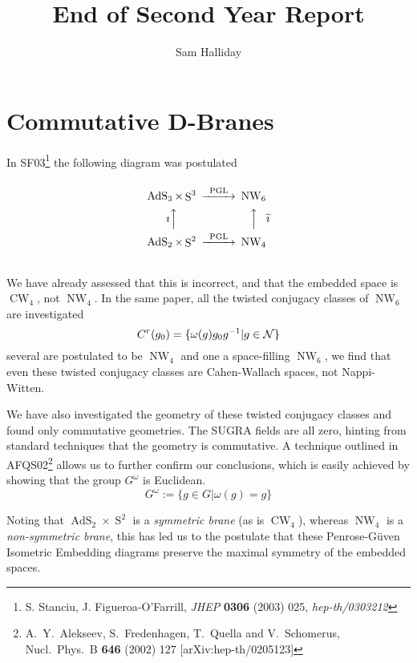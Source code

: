 \documentclass[a4,12pt,titlepage]{seminar}
\DeclareMathOperator{\AdS}{AdS}                         %
\DeclareMathOperator{\Sphere}{S}                        %
\let\S\Sphere                                           %
\DeclareMathOperator{\NW}{NW}                           %
\DeclareMathOperator{\CW}{CW}                           %
\begin{document}
\title{End of Second Year Report}
\author{Sam Halliday}
\maketitle

\section{Commutative D-Branes}

In SF03\footnote{S. Stanciu, J. Figueroa-O'Farrill, \textit{JHEP} \textbf{0306} (2003)
  025, \textit{hep-th/0303212}} the following diagram was postulated
\begin{equation*}
  \begin{CD}
    @.\\
    \AdS_3 \times \S^3             @>\text{PGL}>> \NW_6\\
    \text{$\imath$}@AAA @AAA\text{$\widetilde{\imath}$}\\
    \AdS_2 \times \S^2             @>\text{PGL}>> \NW_4\\
    @.
  \end{CD}
\end{equation*}
We have already assessed that this is incorrect, and that the embedded space is
$\CW_4$, not $\NW_4$. In the same paper, all the twisted conjugacy classes of
$\NW_6$ are investigated
\begin{equation*}
  C^r(g_0)=\{\omega(g)g_0g^{-1}|g\in {\cal N}\}
\end{equation*}
several are postulated to be $\NW_4$ and one a space-filling $\NW_6$, we find
that even these twisted conjugacy classes are Cahen-Wallach spaces, not
Nappi-Witten.

We have also investigated the geometry of these twisted conjugacy classes and
found only commutative geometries. The SUGRA fields are all zero, hinting from
standard techniques that the geometry is commutative. A technique outlined in
AFQS02\footnote{A.~Y.~Alekseev, S.~Fredenhagen, T.~Quella and V.~Schomerus,
  Nucl.\ Phys.\ B {\bf 646} (2002) 127 [arXiv:hep-th/0205123]} allows us to
further confirm our conclusions, which is easily achieved by showing that the
group $G^\omega$ is Euclidean.
\begin{equation*}
  G^\omega:=\{g\in G|\omega(g)=g\}
\end{equation*}

Noting that $\AdS_2 \times \S^2$ is a \textit{symmetric brane} (as is $\CW_4$),
whereas $\NW_4$ is a \textit{non-symmetric brane}, this has led us to the
postulate that these Penrose-G\"{u}ven Isometric Embedding diagrams preserve the
maximal symmetry of the embedded spaces.
\end{document}
